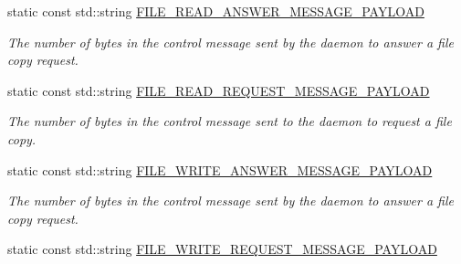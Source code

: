 \begin{DoxyCompactItemize}
\mbox{\label{classwrench_1_1_storage_service_message_payload_ab9de3121513714e1724166d5d636542b}} 
static const std\+::string \hyperlink{classwrench_1_1_storage_service_message_payload_ab9de3121513714e1724166d5d636542b}{F\+I\+L\+E\+\_\+\+R\+E\+A\+D\+\_\+\+A\+N\+S\+W\+E\+R\+\_\+\+M\+E\+S\+S\+A\+G\+E\+\_\+\+P\+A\+Y\+L\+O\+AD}
\begin{DoxyCompactList}\small\item\em The number of bytes in the control message sent by the daemon to answer a file copy request. \end{DoxyCompactList}\item 
\mbox{\label{classwrench_1_1_storage_service_message_payload_a4fc26817876223430c969576c538fe86}} 
static const std\+::string \hyperlink{classwrench_1_1_storage_service_message_payload_a4fc26817876223430c969576c538fe86}{F\+I\+L\+E\+\_\+\+R\+E\+A\+D\+\_\+\+R\+E\+Q\+U\+E\+S\+T\+\_\+\+M\+E\+S\+S\+A\+G\+E\+\_\+\+P\+A\+Y\+L\+O\+AD}
\begin{DoxyCompactList}\small\item\em The number of bytes in the control message sent to the daemon to request a file copy. \end{DoxyCompactList}\item 
\mbox{\label{classwrench_1_1_storage_service_message_payload_a2007d31b5840026e12de2f6231246273}} 
static const std\+::string \hyperlink{classwrench_1_1_storage_service_message_payload_a2007d31b5840026e12de2f6231246273}{F\+I\+L\+E\+\_\+\+W\+R\+I\+T\+E\+\_\+\+A\+N\+S\+W\+E\+R\+\_\+\+M\+E\+S\+S\+A\+G\+E\+\_\+\+P\+A\+Y\+L\+O\+AD}
\begin{DoxyCompactList}\small\item\em The number of bytes in the control message sent by the daemon to answer a file copy request. \end{DoxyCompactList}\item 
\mbox{\label{classwrench_1_1_storage_service_message_payload_a55476bfa112255240bea1619ec660302}} 
static const std\+::string \hyperlink{classwrench_1_1_storage_service_message_payload_a55476bfa112255240bea1619ec660302}{F\+I\+L\+E\+\_\+\+W\+R\+I\+T\+E\+\_\+\+R\+E\+Q\+U\+E\+S\+T\+\_\+\+M\+E\+S\+S\+A\+G\+E\+\_\+\+P\+A\+Y\+L\+O\+AD}

\end{DoxyCompactItemize}
